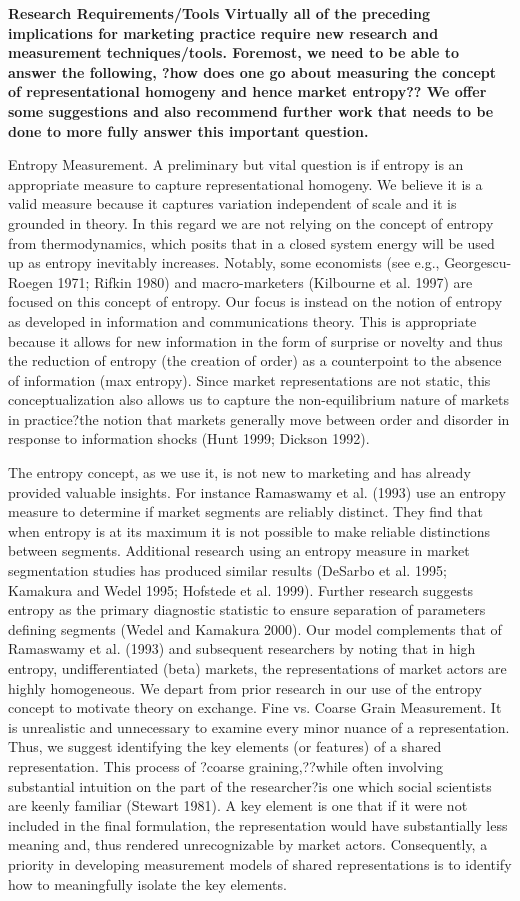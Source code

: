 \bf{Research Requirements/Tools }
Virtually all of the preceding implications for marketing practice require new research and measurement techniques/tools. Foremost, we need to be able to answer the following, ?how does one go about measuring the concept of representational homogeny and hence market entropy?? We offer some suggestions and also recommend further work that needs to be done to more fully answer this important question. 

Entropy Measurement. A preliminary but vital question is if entropy is an appropriate measure to capture representational homogeny. We believe it is a valid measure because it captures variation independent of scale and it is grounded in theory. In this regard we are not relying on the concept of entropy from thermodynamics, which posits that in a closed system energy will be used up as entropy inevitably increases. Notably, some economists (see e.g., Georgescu-Roegen 1971; Rifkin 1980) and macro-marketers (Kilbourne et al. 1997) are focused on this concept of entropy. Our focus is instead on the notion of entropy as developed in information and communications theory. This is appropriate because it allows for new information in the form of surprise or novelty and thus the reduction of entropy (the creation of order) as a counterpoint to the absence of information (max entropy). Since market representations are not static, this conceptualization also allows us to capture the non-equilibrium nature of markets in practice?the notion that markets generally move between order and disorder in response to information shocks (Hunt 1999; Dickson 1992). 

The entropy concept, as we use it, is not new to marketing and has already provided valuable insights. For instance Ramaswamy et al. (1993) use an entropy measure to determine if market segments are reliably distinct. They find that when entropy is at its maximum it is not possible to make reliable distinctions between segments. Additional research using an entropy measure in market segmentation studies has produced similar results (DeSarbo et al. 1995; Kamakura and Wedel 1995; Hofstede et al. 1999). Further research suggests entropy as the primary diagnostic statistic to ensure separation of parameters defining segments (Wedel and Kamakura 2000). Our model complements that of Ramaswamy et al. (1993) and subsequent researchers by noting that in high entropy, undifferentiated (beta) markets, the representations of market actors are highly homogeneous. We depart from prior research in our use of the entropy concept to motivate theory on exchange.
Fine vs. Coarse Grain Measurement. It is unrealistic and unnecessary to examine every minor nuance of a representation. Thus, we suggest identifying the key elements (or features) of a shared representation. This process of ?coarse graining,??while often involving substantial intuition on the part of the researcher?is one which social scientists are keenly familiar (Stewart 1981). A key element is one that if it were not included in the final formulation, the representation would have substantially less meaning and, thus rendered unrecognizable by market actors. Consequently, a priority in developing measurement models of shared representations is to identify how to meaningfully isolate the key elements. 

